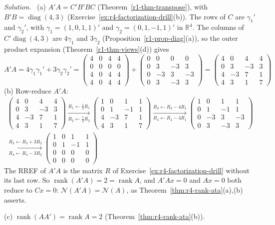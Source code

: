 \documentclass[12pt]{article}
\newcommand{\R}{\mathbb R}
\DeclareMathOperator{\diag}{diag}
\DeclareMathOperator{\rank}{rank}
\theoremstyle{definition}
\newenvironment{solution}{\par\noindent\textit{Solution.}\ }{\par\smallskip}
\begin{document}
\begin{solution}
(a) \(A'A=C'B'BC\) (Theorem~\ref{r1-thm-transpose}), with \(B'B=\diag(4,3)\)
(Exercise~\ref{ex:r4-factorization-drill}(b)). The rows of \(C\) are \(\gamma_1'\) and \(\gamma_2'\), with
\(\gamma_1=(1,0,1,1)'\) and \(\gamma_2=(0,1,-1,1)'\) in \(\R^4\). The columns of \(C'\diag(4,3)\) are \(4\gamma_1\) and
\(3\gamma_2\) (Proposition~\ref{r1-prop-diag}(a)), so the outer product expansion (Theorem~\ref{r1-thm-views}(d)) gives
\[
A'A=4\gamma_1\gamma_1'+3\gamma_2\gamma_2'
=\begin{pmatrix}4&0&4&4\\0&0&0&0\\4&0&4&4\\4&0&4&4\end{pmatrix}
+\begin{pmatrix}0&0&0&0\\0&3&-3&3\\0&-3&3&-3\\0&3&-3&3\end{pmatrix}
=\begin{pmatrix}4&0&4&4\\0&3&-3&3\\4&-3&7&1\\4&3&1&7\end{pmatrix}
\]
(b) Row-reduce \(A'A\):
\[
\begin{gathered}
\begin{pmatrix}4&0&4&4\\0&3&-3&3\\4&-3&7&1\\4&3&1&7\end{pmatrix}
\xrightarrow[R_2\leftarrow\frac13R_2]{R_1\leftarrow\frac14R_1}
\begin{pmatrix}1&0&1&1\\0&1&-1&1\\4&-3&7&1\\4&3&1&7\end{pmatrix}
\xrightarrow[R_4\leftarrow R_4-4R_1]{R_3\leftarrow R_3-4R_1}
\begin{pmatrix}1&0&1&1\\0&1&-1&1\\0&-3&3&-3\\0&3&-3&3\end{pmatrix}
\\
\xrightarrow[R_4\leftarrow R_4-3R_2]{R_3\leftarrow R_3+3R_2}
\begin{pmatrix}1&0&1&1\\0&1&-1&1\\0&0&0&0\\0&0&0&0\end{pmatrix}
\end{gathered}
\]
The RREF of \(A'A\) is the matrix \(R\) of Exercise~\ref{ex:r4-factorization-drill} without its last
row. So \(\rank(A'A)=2=\rank A\), and \(A'Ax=0\) and \(Ax=0\) both reduce to \(Cx=0\):
\(\mathcal N(A'A)=\mathcal N(A)\), as Theorem~\ref{thm:r4-rank-ata}(a),(b) asserts.

(c) \(\rank(AA')=\rank A=2\) (Theorem~\ref{thm:r4-rank-ata}(b)).
\end{solution}
\end{document}
